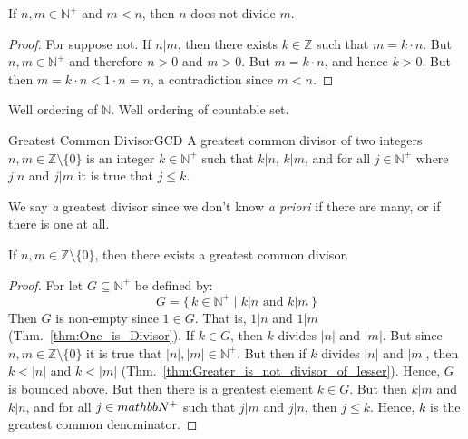 \documentclass{article}                                                        %
\begin{document}
            \begin{theorem}
                \label{thm:Greater_is_not_divisor_of_lesser}%
                If $n,m\in\mathbb{N}^{+}$ and $m<n$, then $n$ does not divide $m$.
            \end{theorem}
            \begin{proof}
                For suppose not. If $n|m$, then there exists $k\in\mathbb{Z}$ such
                that $m=k\cdot{n}$. But $n,m\in\mathbb{N}^{+}$ and therefore $n>0$
                and $m>0$. But $m=k\cdot{n}$, and hence $k>0$. But then
                $m=k\cdot{n}<1\cdot{n}=n$, a contradiction since $m<n$.
            \end{proof}
            Well ordering of $\mathbb{N}$. Well ordering of countable set.
            \begin{fdefinition}{Greatest Common Divisor}{GCD}
                A greatest common divisor of two integers
                $n,m\in\mathbb{Z}\setminus\{0\}$ is an integer $k\in\mathbb{N}^{+}$
                such that $k|n$, $k|m$, and for all $j\in\mathbb{N}^{+}$ where
                $j|n$ and $j|m$ it is true that $j\leq{k}$.
            \end{fdefinition}
            We say \textit{a} greatest divisor since we don't know \textit{a priori}
            if there are many, or if there is one at all.
            \begin{theorem}
                \label{thm:GCD_Existence_Theorem}%
                If $n,m\in\mathbb{Z}\setminus\{0\}$, then there exists a greatest
                common divisor.
            \end{theorem}
            \begin{proof}
                For let $G\subseteq\mathbb{N}^{+}$ be defined by:
                \begin{equation}
                    G=\{\,k\in\mathbb{N}^{+}\;|\;k|n\textrm{ and }k|m\,\}
                \end{equation}
                Then $G$ is non-empty since $1\in{G}$. That is, $1|n$ and $1|m$
                (Thm.~\ref{thm:One_is_Divisor}). If $k\in{G}$, then
                $k$ divides $|n|$ and $|m|$. But since
                $n,m\in\mathbb{Z}\setminus\{0\}$ it is true that
                $|n|,|m|\in\mathbb{N}^{+}$. But then if $k$ divides $|n|$ and $|m|$,
                then $k<|n|$ and $k<|m|$
                (Thm.~\ref{thm:Greater_is_not_divisor_of_lesser}). Hence, $G$ is
                bounded above. But then there is a greatest element $k\in{G}$.
                But then $k|m$ and $k|n$, and for all $j\in\\mathbb{N}^{+}$ such
                that $j|m$ and $j|n$, then $j\leq{k}$. Hence, $k$ is the greatest
                common denominator.
            \end{proof}
\end{document}
